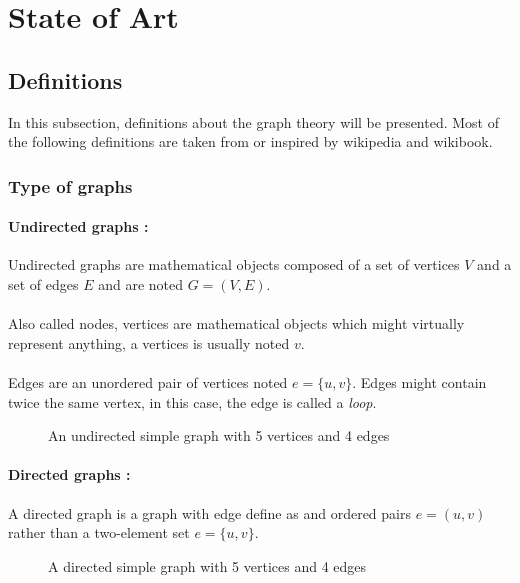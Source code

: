 \section{State of Art}
\subsection{Definitions}
In this subsection, definitions about the graph theory will be presented. Most of the following definitions are taken from or inspired by wikipedia and wikibook.
\subsubsection{Type of graphs}
\paragraph{Undirected graphs :}
Undirected graphs are mathematical objects composed of a set of vertices $V$
and a set of edges $E$ and are noted $G = (V,E)$.

\paragraph{}
Also called nodes, vertices are mathematical objects which might virtually
represent anything, a vertices is usually noted $v$.

\paragraph{}
Edges are an unordered pair of vertices noted $e = \{u,v\}$. Edges might
contain twice the same vertex, in this case, the edge is called a {\em loop}.

\begin{figure}[!h]
  \begin{center}
    
  \end{center}
  \caption{An undirected simple graph with 5 vertices and 4 edges}
\end{figure}

\paragraph{Directed graphs :} 
A directed graph is a graph with edge define as and ordered pairs $e = (u,v)$ rather than a two-element set $e = \{u,v\}$.
\begin{figure}[!h]
  \begin{center}
    
  \end{center}
  \caption{A directed simple graph with 5 vertices and 4 edges}
\end{figure}

